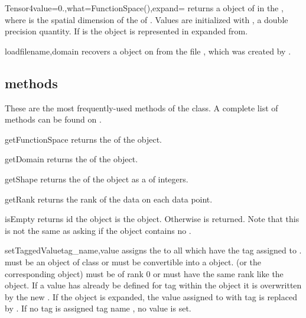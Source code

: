 \begin{funcdesc}{Tensor4}{value=0.,what=FunctionSpace(),expand=\False}
returns a \Data object of \Shape {} in the \FunctionSpace {},
where  is the spatial dimension of the \Domain of .
Values are initialized with , a double precision quantity. If  is \True
the \Data object is represented in expanded from.
\end{funcdesc}

\begin{funcdesc}{load}{filename,domain}
recovers a \Data object on \Domain {} from the file , which was created by .
\end{funcdesc}

\subsection{\Data methods}
These are the most frequently-used methods of the 
\Data class. A complete list of methods can be found on \ReferenceGuide.
\begin{methoddesc}[Data]{getFunctionSpace}{}
returns the \FunctionSpace of the object.
\end{methoddesc}

\begin{methoddesc}[Data]{getDomain}{}
returns the \Domain  of the object.
\end{methoddesc}

\begin{methoddesc}[Data]{getShape}{}
returns the \Shape  of the object as a  of
integers.
\end{methoddesc}

\begin{methoddesc}[Data]{getRank}{}
returns the rank of the data on each data point. 
\end{methoddesc}

\begin{methoddesc}[Data]{isEmpty}{}
returns \True id the \Data object is the \EmptyData object.
Otherwise \False is returned.
Note that this is not the same as asking if the object contains no \DataSamplePoints.
\end{methoddesc}

\begin{methoddesc}[Data]{setTaggedValue}{tag_name,value}
assigns the  to all \DataSamplePoints which have the tag
assigned to .  must be an object of class
 or must be convertible into a
 object.  (or the corresponding
 object) must be of rank $0$ or must have the
same rank like the object.
If a value has already be defined for tag  within the object
it is overwritten by the new .  If the object is expanded,
the value assigned to \DataSamplePoints with tag  is replaced by
. If no tag is assigned tag name , no value is set.
\end{methoddesc}

